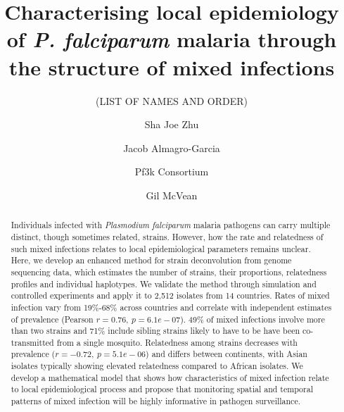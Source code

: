 \documentclass[9pt,lineno]{elife}
\newcounter{todocounter}
\newcommand{\done}[2][]
{\todo[color=green!40, #1]{#2}}
\newcommand{\donenum}[2][]
{\stepcounter{todocounter}\done[#1]{\thetodocounter: #2}}
\begin{document}
\title{Characterising local epidemiology of {\it P. falciparum} malaria through the structure of mixed infections}
\newcommand\shorttitle{Mixed infections in malaria}
\date{}

\author[?]{(LIST OF NAMES AND ORDER)}
\author[1]{Sha Joe Zhu}
\author[1,2,3,4]{Jacob Almagro-Garcia}
\author[?]{Pf3k Consortium}
\author[1,3]{Gil McVean}



\maketitle{}

\begin{abstract}
Individuals infected with {\it Plasmodium falciparum} malaria pathogens can carry multiple distinct, though sometimes related, strains.  However, how the rate and relatedness of such mixed infections relates to local epidemiological parameters remains unclear.  Here, we develop an enhanced method for strain deconvolution from genome sequencing data, which estimates the number of strains, their proportions, relatedness profiles and individual haplotypes.  We validate the method through simulation and controlled experiments and apply it to 2,512 isolates from 14 countries.  Rates of mixed infection vary from 19\%-68\% across countries and correlate with independent estimates of prevalence (Pearson $r = 0.76,~p = 6.1e-07$).  49\% of mixed infections involve more than two strains and 71\% include sibling strains likely to have to be have been co-transmitted from a single mosquito.  Relatedness among strains decreases with prevalence ($r = -0.72,~p = 5.1e-06$) and differs between continents, with Asian isolates typically showing elevated relatedness compared to African isolates.  We develop a mathematical model that shows how characteristics of mixed infection relate to local epidemiological process and propose that monitoring spatial and temporal patterns of mixed infection will be highly informative in pathogen surveillance.
\end{abstract}
\end{document}

